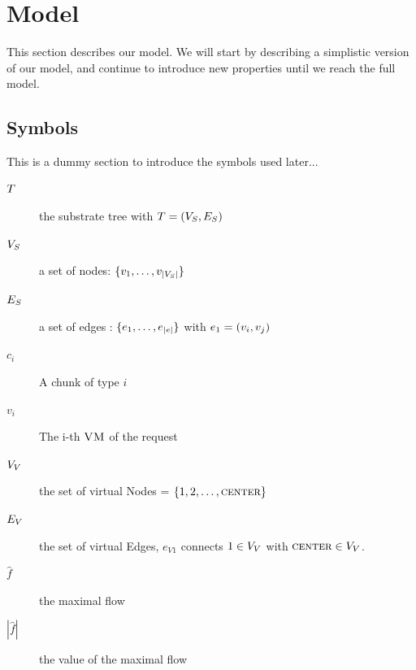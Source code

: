 \section{Model}

This section describes our model. We will start by describing a simplistic 
version of our model, and continue to introduce new properties until we reach 
the full model.

\subsection{Symbols}

This is a dummy section to introduce the symbols used later...

\begin{description}
 \item [$T$] the substrate tree with $T = (V_S , E_S)$
 \item [$V_S$]  a set of nodes: $\{v_1, \dots , 
v_{|V_S|}\}$
 \item [$E_S$] a set of edges : $\{e_1, \dots , 
 e_{|e|}\}$ with $e_1 = 
(v_i, v_j)$
 \item [$c_i$] A chunk of type $i$
 \item [$v_i$] The i-th $\textsc{VM}$ of the request
 \item [$V_V$] the set of virtual Nodes = $\{1,2,\dots,\textsc{center}\}$
 \item [$E_V$] the set of virtual Edges, $e_{V1}$ connects $1 \in 
V_V$ with $\textsc{center} \in V_V$.
 \item [$\hat f$] the maximal flow
 \item [$|\hat f|$] the value of the maximal flow
 

\end{description}
